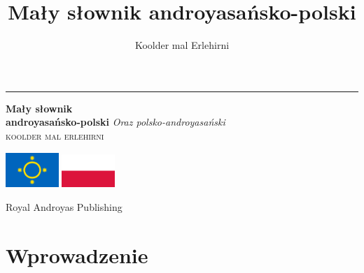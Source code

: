 \documentclass[openany, twoside, b5paper]{book}
\begin{document}
\author{Koolder mal Erlehirni}
\title{Mały słownik androyasańsko-polski}

\frontmatter

\begin{titlepage} %
    \newcommand*{\plogo}{\fbox{$\mathcal{AND}$}} %
    
	\raggedleft %
	
	\rule{1pt}{\textheight} %
	\hspace{0.05\textwidth} %
	\parbox[b]{0.75\textwidth}{ %
		
        {\Huge\bfseries Mały słownik\\ androyasańsko-polski}
        {\large\textit{Oraz polsko-androyasański}}\\[4\baselineskip]
		{\Large\textsc{koolder mal erlehirni}} %
        
        \bigskip

        \includegraphics[width=2cm]{androyas-flag}
        \includegraphics[width=2cm]{pl-flag}

        \vspace{0.5\textheight} %
		
		{\noindent Royal Androyas Publishing~~\plogo}\\[\baselineskip] %
	}

\end{titlepage}

\clearpage


\tableofcontents

\mainmatter
\chapter{Wprowadzenie}




%

%

\backmatter
\end{document}
